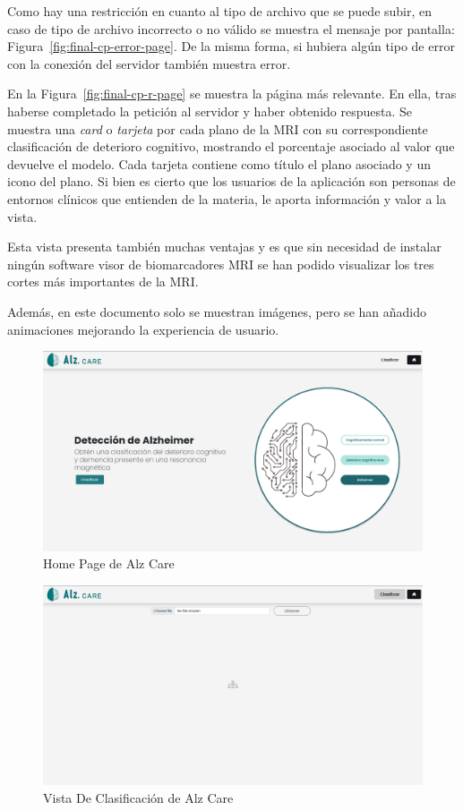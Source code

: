 Como hay una restricción en cuanto al tipo de archivo que se puede subir, en caso de tipo de archivo incorrecto o no
válido se muestra el mensaje por pantalla: Figura~\ref{fig:final-cp-error-page}.
De la misma forma, si hubiera algún tipo de error con la conexión del servidor también muestra error.

En la Figura~\ref{fig:final-cp-r-page} se muestra la página más relevante.
En ella, tras haberse completado la petición al servidor y haber obtenido respuesta.
Se muestra una \textit{card} o \textit{tarjeta} por cada plano de la MRI con su correspondiente clasificación de
deterioro cognitivo, mostrando el porcentaje asociado al valor que devuelve el modelo.
Cada tarjeta contiene como título el plano asociado y un icono del plano.
Si bien es cierto que los usuarios de la aplicación son personas de entornos clínicos que entienden de la materia,
le aporta información y valor a la vista.

Esta vista presenta también muchas ventajas y es que sin necesidad de instalar ningún software visor de biomarcadores
MRI se han podido visualizar los tres cortes más importantes de la MRI.

Además, en este documento solo se muestran imágenes, pero se han añadido animaciones mejorando la experiencia de usuario.

\begin{figure}[H]
    \centering
    \includegraphics[width=\textwidth]{./imgs/app/final-home}
    \caption{Home Page de Alz Care}
    \label{fig:home-page}
\end{figure}

\begin{figure}[H]
    \centering
    \includegraphics[width=\textwidth]{./imgs/app/final-cp}
    \caption{Vista De Clasificación de Alz Care}
    \label{fig:final-cp-page}
\end{figure}

